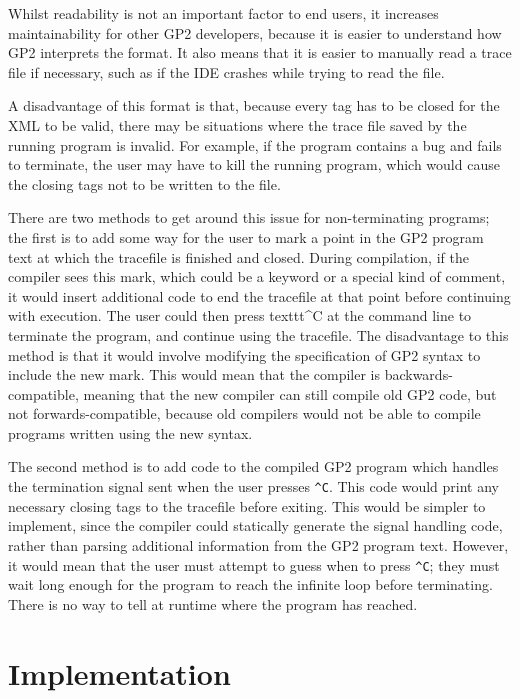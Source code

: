 \documentclass[authoryearcitations]{UoYCSproject}
\begin{document}
Whilst readability is not an important factor to end users, it increases
maintainability for other GP2 developers, because it is easier to understand
how GP2 interprets the format. It also means that it is easier to manually read
a trace file if necessary, such as if the IDE crashes while trying to read the
file.

A disadvantage of this format is that, because every tag has to be closed for
the XML to be valid, there may be situations where the trace file saved by the
running program is invalid. For example, if the program contains a bug and fails
to terminate, the user may have to kill the running program, which would cause
the closing tags not to be written to the file.

There are two methods to get around this issue for non-terminating programs; the
first is to add some way for the user to mark a point in the GP2 program text
at which the tracefile is finished and closed. During compilation, if the compiler
sees this mark, which could be a keyword or a special kind of comment, it would
insert additional code to end the tracefile at that point before continuing with
execution. The user could then press texttt{\textasciicircum C} at the
command line to terminate the program, and continue using the tracefile.
The disadvantage to this method is that it would involve modifying the specification
of GP2 syntax to include the new mark. This would mean that the compiler is
backwards-compatible, meaning that the new compiler can still compile old GP2 code,
but not forwards-compatible, because old compilers would not be able to compile
programs written using the new syntax.

The second method is to add code to the compiled GP2 program which handles the
termination signal sent when the user presses \texttt{\textasciicircum C}. This
code would print any necessary closing tags to the tracefile before exiting. This
would be simpler to implement, since the compiler could statically generate the
signal handling code, rather than parsing additional information from the GP2
program text. However, it would mean that the user must attempt to guess when to
press \texttt{\textasciicircum C}; they must wait long enough for the program to
reach the infinite loop before terminating. There is no way to tell at runtime
where the program has reached.

\clearpage


\chapter{Implementation}
\label{cha:Implementation}
\end{document}
